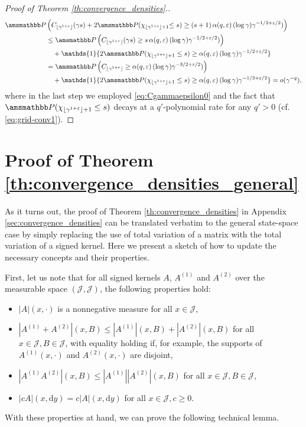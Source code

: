 \documentclass[11pt,leqno]{amsart}
\numberwithin{table}{section}
\numberwithin{figure}{section}
\numberwithin{equation}{section}
\newcommand{\dd}{\mathrm{d}}
\newcommand{\1}{{\mathds{1}}}
\newcommand{\0}{\mat{0}}
\renewcommand{\P }{{\amsmathbb P}}
\begin{document}
{\begin{proof}[Proof of Theorem \ref{th:convergence_densities}.]
\begin{align*}
\P&\left( C_{\lfloor \gamma^{1+\varepsilon} \rfloor}(\gamma s) + 2 \P(\chi_{\lfloor \gamma^{1+\varepsilon} \rfloor +1} { \le s)}\ge(s+1)\,\alpha(q,\varepsilon)\,(\log \gamma)\gamma^{-1/2 + \varepsilon/2}) \right)\\
&\le \P\left( C_{\lfloor \gamma^{1+\varepsilon} \rfloor}(\gamma s) \ge s\,\alpha(q,\varepsilon)\,(\log \gamma)\gamma^{-1/2 + \varepsilon/2}) \right)\\
&\quad + \mathds{1}\{2 \P(\chi_{\lfloor \gamma^{1+\varepsilon} \rfloor +1}\le s) \ge \alpha(q,\varepsilon)\,(\log \gamma)\gamma^{-1/2 + \varepsilon/2}\}\\
& = \P\left( C_{\lfloor \gamma^{1+\varepsilon} \rfloor} \ge \alpha(q,\varepsilon)\,(\log \gamma)\gamma^{-3/2 + \varepsilon/2}) \right)\\
&\quad + \mathds{1}\{2 \P(\chi_{\lfloor \gamma^{1+\varepsilon} \rfloor +1}\le s) \ge \alpha(q,\varepsilon)\,(\log \gamma)\gamma^{-1/2 + \varepsilon/2}\} = o(\gamma^{-q}),
\end{align*}
where in the last step we employed \eqref{eq:Cgammaepsilon0} and the fact that $\P(\chi_{\lfloor \gamma^{1+\varepsilon} \rfloor +1}\le s)$ decays at a $q'$-polynomial rate for any $q'>0$ (cf. \eqref{eq:grid-conv1}).
\end{proof}

{
     \section{Proof of Theorem \ref{th:convergence_densities_general}}\label{sec:GeneralProofs}  

As it turns out, the proof of Theorem \ref{th:convergence_densities} in Appendix \ref{sec:convergence_densities} can be translated verbatim to the general state-space case by simply replacing the use of total variation of a matrix with the total variation of a signed kernel. Here we present a sketch of how to update the necessary concepts and their properties.

First, let us note that for all signed kernels $A$, $A^{(1)}$ and $A^{(2)}$ over the measurable space $(\mathcal{J},\mathscr{J})$, the following properties hold:
\begin{itemize}
       \item $|A|(x,\cdot)$ is a nonnegative measure for all $x\in \mathcal{J}$,
       \item $|A^{(1)}+A^{(2)}|(x,B)\le |A^{(1)}|(x,B) + |A^{(2)}|(x,B)$ for all $x\in\mathcal{J}, B\in\mathscr{J}$, with equality holding if, for example, the supports of $A^{(1)}(x,\cdot)$ and $A^{(2)}(x,\cdot)$ are disjoint,
       \item $|A^{(1)}A^{(2)}|(x,B)\le |A^{(1)}||A^{(2)}|(x,B)$ for all $x\in\mathcal{J}, B\in\mathscr{J}$,
       \item $|c A|(x,\dd y) = c|A|(x,\dd y)$ for all $x\in\mathcal{J}, c\ge 0$.
\end{itemize}
With these properties at hand, we can prove the following technical lemma.


}}
\end{document}
